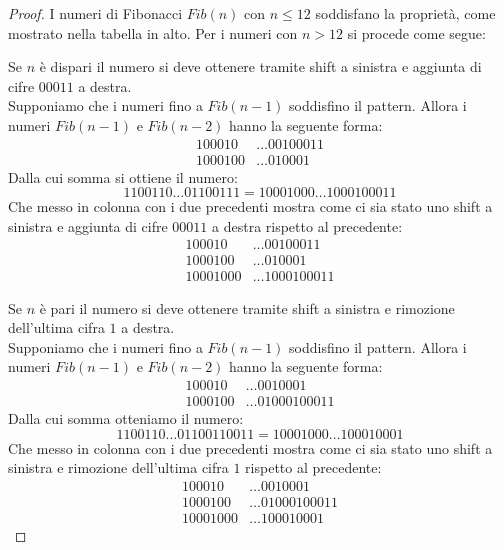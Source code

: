 \documentclass[Lau]{sapthesis}
\begin{document}
\begin{proof}
I numeri di Fibonacci $Fib(n)$ con $n \leq 12$ soddisfano la proprietà, come mostrato nella tabella in alto. Per i numeri con $n > 12$ si procede come segue:

\medskip

Se $n$ è dispari il numero si deve ottenere tramite shift a sinistra e aggiunta di cifre $00011$ a destra.\\
Supponiamo che i numeri fino a $Fib(n-1)$ soddisfino il pattern. Allora i numeri $Fib(n-1)$ e $Fib(n-2)$ hanno la seguente forma:
\begin{align*}
 100010 & \ldots 00100011 \tag{$n-2$}\\
1000100 & \ldots 010001   \tag{$n-1$}
\end{align*}
Dalla cui somma si ottiene il numero:
$$1100110 \ldots 01100111 = 10001000 \ldots 1000100011$$
Che messo in colonna con i due precedenti mostra come ci sia stato uno shift a sinistra e aggiunta di cifre $00011$ a destra rispetto al precedente:
\begin{align*}
  100010 & \ldots 00100011   \tag{$n-2$}\\
 1000100 & \ldots 010001     \tag{$n-1$}\\
10001000 & \ldots 1000100011 \tag{$n$}
\end{align*}

\vspace{1.5cm}

Se $n$ è pari il numero si deve ottenere tramite shift a sinistra e rimozione dell'ultima cifra $1$ a destra.\\
Supponiamo che i numeri fino a $Fib(n-1)$ soddisfino il pattern. Allora i numeri $Fib(n-1)$ e $Fib(n-2)$ hanno la seguente forma:
\begin{align*}
 100010 & \ldots 0010001     \tag{$n-2$}\\
1000100 & \ldots 01000100011 \tag{$n-1$}
\end{align*}
Dalla cui somma otteniamo il numero:
$$1100110 \ldots 01100110011 = 10001000 \ldots 100010001$$
Che messo in colonna con i due precedenti mostra come ci sia stato uno shift a sinistra e rimozione dell'ultima cifra $1$ rispetto al precedente:
\begin{align*}
  100010 & \ldots 0010001     \tag{$n-2$}\\
 1000100 & \ldots 01000100011 \tag{$n-1$}\\
10001000 & \ldots 100010001   \tag{$n$}
\end{align*}
\end{proof}
\end{document}
